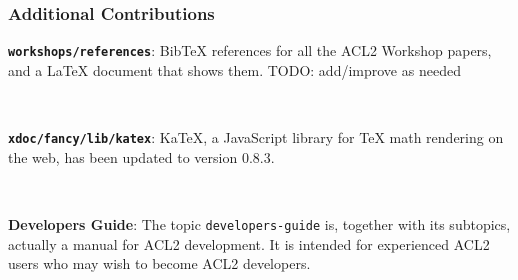 \documentclass{beamer}
\newcommand{\code}[1]{\texttt{#1}}
\newcommand{\bookpath}[1]{\textbf{\code{#1}}}
\begin{document}
\begin{frame}

\frametitle{Additional Contributions}

\bookpath{workshops/references}:
BibTeX references for all the ACL2 Workshop papers,
and a LaTeX document that shows them.
TODO: add/improve as needed

\

\bookpath{xdoc/fancy/lib/katex}:
KaTeX, a JavaScript library for TeX math rendering on the web,
has been updated to version 0.8.3.

\

\textbf{Developers Guide}:
The topic \code{developers-guide} is, together with its subtopics, actually a
manual for ACL2 development.  It is intended for experienced ACL2
users who may wish to become ACL2 developers.

\end{frame}

\end{document}
